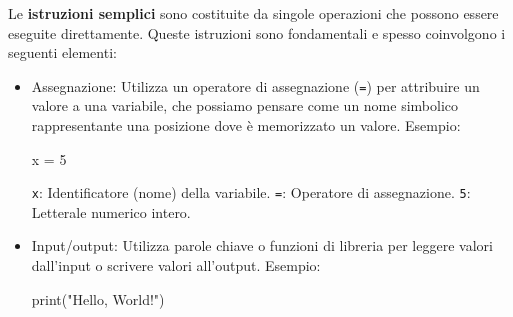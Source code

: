 \documentclass[
  letterpaper,
  DIV=11,
  numbers=noendperiod]{scrreprt}
\newenvironment{Shaded}{\begin{snugshade}}{\end{snugshade}}
\newcommand{\NormalTok}[1]{\textcolor[rgb]{0.00,0.23,0.31}{#1}}
\begin{document}
Le \textbf{istruzioni semplici} sono costituite da singole operazioni
che possono essere eseguite direttamente. Queste istruzioni sono
fondamentali e spesso coinvolgono i seguenti elementi:

\begin{itemize}
\item
  Assegnazione: Utilizza un operatore di assegnazione (\texttt{=}) per
  attribuire un valore a una variabile, che possiamo pensare come un
  nome simbolico rappresentante una posizione dove è memorizzato un
  valore. Esempio:

\begin{Shaded}
\begin{Highlighting}[]
\NormalTok{x = 5}
\end{Highlighting}
\end{Shaded}

  \texttt{x}: Identificatore (nome) della variabile. \texttt{=}:
  Operatore di assegnazione. \texttt{5}: Letterale numerico intero.
\item
  Input/output: Utilizza parole chiave o funzioni di libreria per
  leggere valori dall'input o scrivere valori all'output. Esempio:

\begin{Shaded}
\begin{Highlighting}[]
\NormalTok{print("Hello, World!")}
\end{Highlighting}
\end{Shaded}


\end{itemize}
\end{document}

